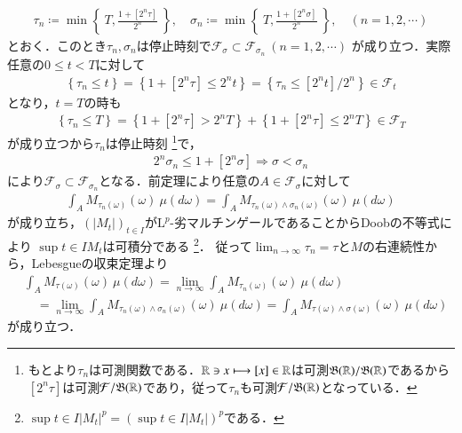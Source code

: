 	\begin{prf}
		\begin{align}
			\tau_n \coloneqq \min{}{\left\{\ T, \frac{1+[2^n \tau]}{2^n}\ \right\}},
			\quad \sigma_n \coloneqq \min{}{\left\{\ T, \frac{1+[2^n \sigma]}{2^n}\ \right\}},
			\quad (n=1,2,\cdots)
		\end{align}
		とおく．このとき$\tau_n,\sigma_n$は停止時刻で$\mathcal{F}_\sigma \subset \mathcal{F}_{\sigma_n}\ (n=1,2,\cdots)$
		が成り立つ．実際任意の$0 \leq t < T$に対して
		\begin{align}
			\left\{ \tau_n \leq t \right\} = \left\{ 1 + [2^n \tau] \leq 2^n t \right\} = \left\{ \tau_n \leq [2^n t]/2^n \right\} \in \mathcal{F}_t
		\end{align}
		となり，$t = T$の時も
		\begin{align}
			\left\{ \tau_n \leq T \right\} = \left\{ 1 + [2^n \tau] > 2^n T \right\} + \left\{ 1 + [2^n \tau] \leq 2^n T \right\} \in \mathcal{F}_T
		\end{align}
		が成り立つから$\tau_n$は停止時刻
		\footnote{
			もとより$\tau_n$は可測関数である．$\mathbb{R} \ni x \longmapsto [x] \in \mathbb{R}$は可測$\mathfrak{B}(\mathbb{R})/\mathfrak{B}(\mathbb{R})$であるから
			$[2^n \tau]$は可測$\mathcal{F}/\mathfrak{B}(\mathbb{R})$であり，従って$\tau_n$も可測$\mathcal{F}/\mathfrak{B}(\mathbb{R})$となっている．
		}で，
		\begin{align}
			2^n \sigma_n \leq 1 + [2^n \sigma] 
			\Rightarrow \sigma < \sigma_n
		\end{align}
		により$\mathcal{F}_\sigma \subset \mathcal{F}_{\sigma_n}$となる．前定理により任意の$A \in \mathcal{F}_\sigma$に対して
		\begin{align}
			\int_A M_{\tau_n(\omega)}(\omega)\ \mu(d\omega) = \int_A M_{\tau_n(\omega)\wedge \sigma_n(\omega)}(\omega)\ \mu(d\omega) 
		\end{align}
		が成り立ち，$(|M_t|)_{t \in I}$が$\mathrm{L}^p$-劣マルチンゲールであることからDoobの不等式により
		$\sup{t \in I}{M_t}$は可積分である
		\footnote{
			$\sup{t \in I}{|M_t|^p} = \left( \sup{t \in I}{|M_t|} \right)^p$である．
		}．
		従って$\lim_{n \to \infty} \tau_n = \tau$と$M$の右連続性から，Lebesgueの収束定理より
		\begin{align}
			&\int_A M_{\tau(\omega)}(\omega)\ \mu(d\omega) = \lim_{n \to \infty} \int_A M_{\tau_n(\omega)}(\omega)\ \mu(d\omega) \\
			&\quad = \lim_{n \to \infty} \int_A M_{\tau_n(\omega)\wedge \sigma_n(\omega)}(\omega)\ \mu(d\omega)
			= \int_A M_{\tau(\omega)\wedge \sigma(\omega)}(\omega)\ \mu(d\omega)
		\end{align}
		が成り立つ．
		\QED
	\end{prf}
	
